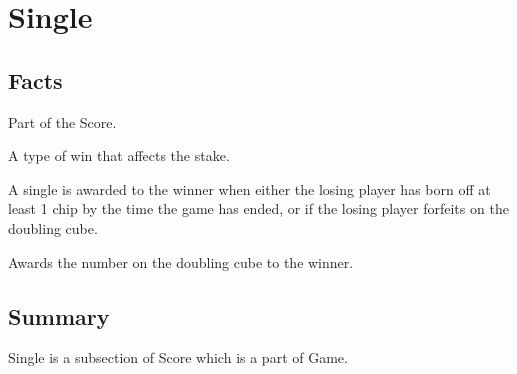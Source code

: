 \section{Single}

\subsection{Facts}
\begin{dashed}
    \item Part of the Score.
    \item A type of win that affects the stake.
    \item A single is awarded to the winner when either the losing player has born off at least 1 chip by the time the game has ended, or if the losing player forfeits on the doubling cube.
    \item Awards the number on the doubling cube to the winner.
\end{dashed}


\subsection{Summary}
Single is a subsection of Score which is a part of Game.
